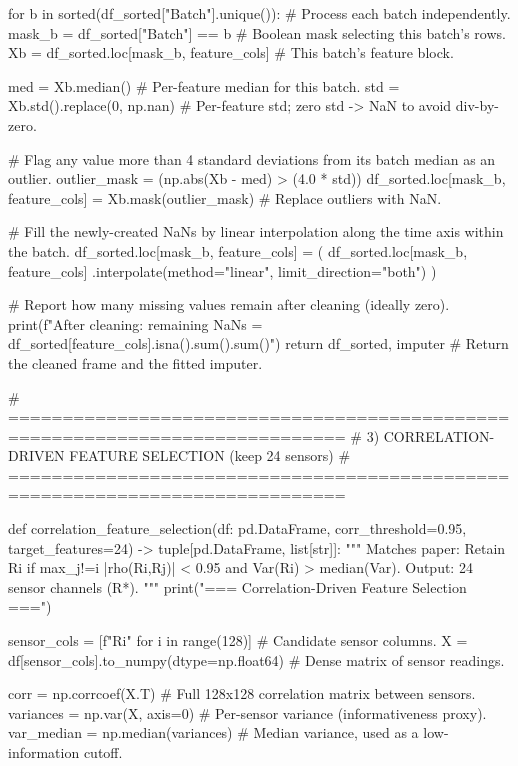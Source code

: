     for b in sorted(df_sorted["Batch"].unique()):  # Process each batch independently.
        mask_b = df_sorted["Batch"] == b   # Boolean mask selecting this batch's rows.
        Xb = df_sorted.loc[mask_b, feature_cols]  # This batch's feature block.

        med = Xb.median()                  # Per-feature median for this batch.
        std = Xb.std().replace(0, np.nan)  # Per-feature std; zero std -> NaN to avoid div-by-zero.

        # Flag any value more than 4 standard deviations from its batch median as an outlier.
        outlier_mask = (np.abs(Xb - med) > (4.0 * std))
        df_sorted.loc[mask_b, feature_cols] = Xb.mask(outlier_mask)  # Replace outliers with NaN.

        # Fill the newly-created NaNs by linear interpolation along the time axis within the batch.
        df_sorted.loc[mask_b, feature_cols] = (
            df_sorted.loc[mask_b, feature_cols]
            .interpolate(method="linear", limit_direction="both")
        )

    # Report how many missing values remain after cleaning (ideally zero).
    print(f"After cleaning: remaining NaNs = {df_sorted[feature_cols].isna().sum().sum()}")
    return df_sorted, imputer              # Return the cleaned frame and the fitted imputer.

# =============================================================================
# 3) CORRELATION-DRIVEN FEATURE SELECTION (keep 24 sensors)
# =============================================================================

def correlation_feature_selection(df: pd.DataFrame,
                                 corr_threshold=0.95,
                                 target_features=24) -> tuple[pd.DataFrame, list[str]]:
    """
    Matches paper:
    Retain Ri if max_j!=i |rho(Ri,Rj)| < 0.95 and Var(Ri) > median(Var).
    Output: 24 sensor channels (R*).
    """
    print("\n=== Correlation-Driven Feature Selection ===")

    sensor_cols = [f"R{i}" for i in range(128)]            # Candidate sensor columns.
    X = df[sensor_cols].to_numpy(dtype=np.float64)         # Dense matrix of sensor readings.

    corr = np.corrcoef(X.T)                # Full 128x128 correlation matrix between sensors.
    variances = np.var(X, axis=0)          # Per-sensor variance (informativeness proxy).
    var_median = np.median(variances)      # Median variance, used as a low-information cutoff.


